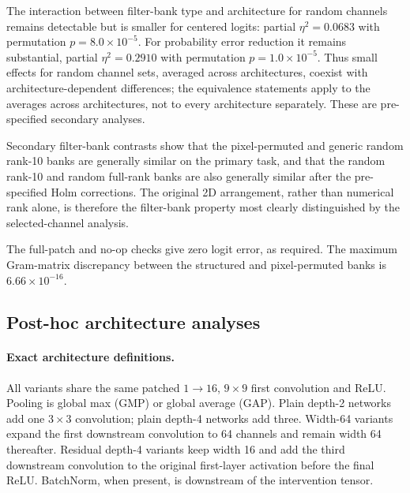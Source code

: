 The interaction between filter-bank type and architecture for random channels remains detectable but is smaller for centered logits: partial $\eta^2=0.0683$ with permutation $p=8.0\times10^{-5}$. For probability error reduction it remains substantial, partial $\eta^2=0.2910$ with permutation $p=1.0\times10^{-5}$. Thus small effects for random channel sets, averaged across architectures, coexist with architecture-dependent differences; the equivalence statements apply to the averages across architectures, not to every architecture separately. These are pre-specified secondary analyses.

Secondary filter-bank contrasts show that the pixel-permuted and generic random rank-10 banks are generally similar on the primary task, and that the random rank-10 and random full-rank banks are also generally similar after the pre-specified Holm corrections. The original 2D arrangement, rather than numerical rank alone, is therefore the filter-bank property most clearly distinguished by the selected-channel analysis.

The full-patch and no-op checks give zero logit error, as required. The maximum Gram-matrix discrepancy between the structured and pixel-permuted banks is $6.66\times10^{-16}$.

\subsection{Post-hoc architecture analyses}\label{app:architecture-posthoc}

\paragraph{Exact architecture definitions.}
All variants share the same patched $1\!\to\!16$, $9\times9$ first convolution and ReLU. Pooling is global max (GMP) or global average (GAP). Plain depth-2 networks add one $3\times3$ convolution; plain depth-4 networks add three. Width-64 variants expand the first downstream convolution to 64 channels and remain width 64 thereafter. Residual depth-4 variants keep width 16 and add the third downstream convolution to the original first-layer activation before the final ReLU. BatchNorm, when present, is downstream of the intervention tensor.

